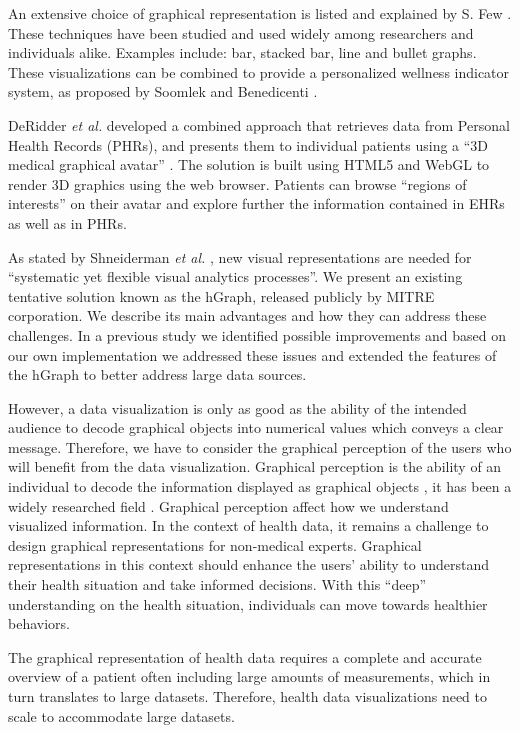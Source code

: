 \documentclass[twocolumn]{bmcart}%
\begin{document}
An extensive choice of graphical representation is listed and explained by S. Few \cite{few2006information}. These techniques have been studied and used widely among researchers and individuals alike. Examples include: bar, stacked bar, line and bullet graphs. These visualizations can be combined to provide a personalized wellness indicator system, as proposed by Soomlek and Benedicenti \cite{Soomlek:2013:AWI:2532685.2532686}.

DeRidder \textit{et al.} developed a combined approach that retrieves data from Personal Health Records (PHRs), and presents them to individual patients using a ``3D medical graphical avatar'' \cite{de2013web}. The solution is built using HTML5 and WebGL to render 3D graphics using the web browser. Patients can browse ``regions of interests'' on their avatar and explore further the information contained in EHRs as well as in PHRs.

As stated by Shneiderman \textit{et al.} \cite{shneiderman2013improving}, new visual representations are needed for ``systematic yet flexible visual analytics processes''. We present an existing tentative solution known as the hGraph, released publicly by MITRE corporation. We describe its main advantages and how they can address these challenges. In a previous study \cite{EMBCLedNiem} we identified possible improvements and based on our own implementation we addressed these issues and extended the features of the hGraph to better address large data sources.

However, a data visualization is only as good as the ability of the intended audience to decode graphical objects into numerical values which conveys a clear message. Therefore, we have to consider the graphical perception of the users who will benefit from the data visualization. Graphical perception is the ability of an individual to decode the information displayed as graphical objects \cite{baird1978fundamentals}, it has been a widely researched field \cite{cleveland1984graphical}. Graphical perception affect how we understand visualized information. In the context of health data, it remains a challenge to design graphical representations for non-medical experts. Graphical representations in this context should enhance the users' ability to understand their health situation and take informed decisions. With this ``deep'' understanding on the health situation, individuals can move towards healthier behaviors.

The graphical representation of health data requires a complete and accurate overview of a patient often including large amounts of measurements, which in turn translates to large datasets. Therefore, health data visualizations need to scale to accommodate large datasets. 
\end{document}
